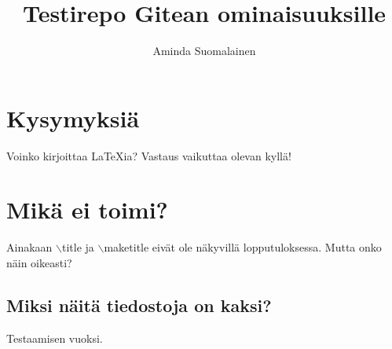 \documentclass[a4paper]{artikel3}
\title{Testirepo Gitean ominaisuuksille}
\author{Aminda Suomalainen}
\begin{document}
\maketitle
\section*{Kysymyksiä}
Voinko kirjoittaa \LaTeX ia? Vastaus vaikuttaa olevan kyllä!
\section*{Mikä ei toimi?}
Ainakaan $\backslash$title ja $\backslash$maketitle eivät ole näkyvillä lopputuloksessa. Mutta onko näin oikeasti?
\subsection*{Miksi näitä tiedostoja on kaksi?}
Testaamisen vuoksi.
\end{document}
